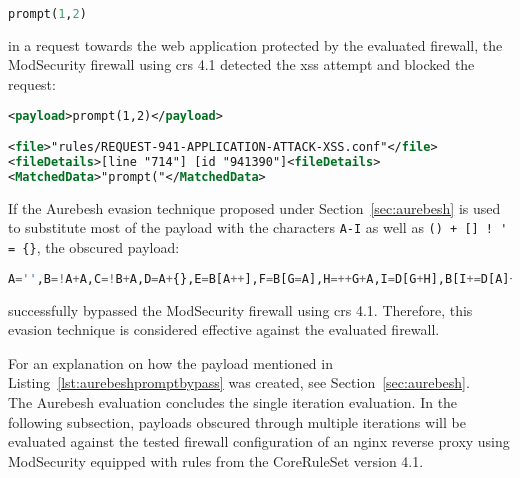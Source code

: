\begin{lstlisting}[style=basicStyle, language=Python]
prompt(1,2)
\end{lstlisting}

in a request towards the web application protected by the evaluated firewall, the ModSecurity firewall using \acrshort{crs} 4.1 detected the \acrshort{xss} attempt and blocked the request:

\begin{lstlisting}[style=ruleStyle, language=XML, caption={prompt(1,2) blocked}, label=lst:promptblocked]
<payload>prompt(1,2)</payload>

<file>"rules/REQUEST-941-APPLICATION-ATTACK-XSS.conf"</file>
<fileDetails>[line "714"] [id "941390"]<fileDetails>
<MatchedData>"prompt("</MatchedData>
\end{lstlisting}

If the Aurebesh evasion technique proposed under Section~\ref{sec:aurebesh} is used to substitute most of the payload with the characters \verb|A-I| as well as \verb|() + [] ! ' = {}|, the obscured payload: 

\begin{lstlisting}[style=basicStyle, language=Python, caption=Aurebesh.js bypass, label={lst:aurebeshpromptbypass}]
A='',B=!A+A,C=!B+A,D=A+{},E=B[A++],F=B[G=A],H=++G+A,I=D[G+H],B[I+=D[A]+(B.C+D)[A]+C[H]+E+F+B[G]+I+E+D[A]+F][I]('p'+F+D[A]+'m'+'p'+E+'(A,++A)')()
\end{lstlisting}

successfully bypassed the ModSecurity firewall using \acrshort{crs} 4.1. Therefore, this evasion technique is considered effective against the evaluated firewall.

For an explanation on how the payload mentioned in Listing~\ref{lst:aurebeshpromptbypass} was created, see Section~\ref{sec:aurebesh}. \\

The Aurebesh evaluation concludes the single iteration evaluation. In the following subsection, payloads obscured through multiple iterations will be evaluated against the tested firewall configuration of an nginx reverse proxy using ModSecurity equipped with rules from the CoreRuleSet version 4.1.
